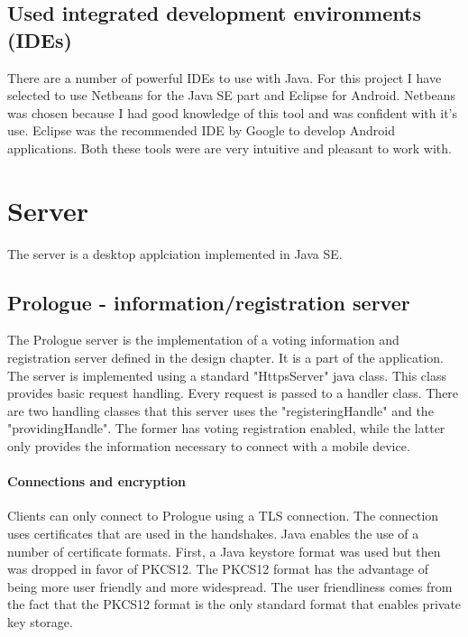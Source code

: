 \documentclass[11pt,twoside,a4paper]{book}
\begin{document}
\subsection{Used integrated development environments (IDEs)}
There are a number of powerful IDEs to use with Java. For this project I have selected to use Netbeans for the Java SE part and Eclipse for Android. Netbeans was chosen because I had good knowledge of this tool and was confident with it's use. Eclipse was the recommended IDE by Google to develop Android applications. Both these tools were are very intuitive and pleasant to work with. 

\section{Server}
The server is a desktop applciation implemented in Java SE.
\subsection{Prologue - information/registration server}
The Prologue server is the implementation of a voting information and registration server defined in the design chapter. It is a part of the application. The server is implemented using a standard "HttpsServer" java class. This class provides basic request handling. Every request is passed to a handler class. There are two handling classes that this server uses the "registeringHandle" and the "providingHandle". The former has voting registration enabled, while the latter only provides the information necessary to connect with a mobile device.
\paragraph{Connections and encryption}
Clients can only connect to Prologue using a TLS\cite{tls} connection. The connection uses certificates that are used in the handshakes. Java enables the use of a number of certificate formats. First, a Java keystore format was used but then was dropped in favor of PKCS12\cite{pkcs12}. The PKCS12 format has the advantage of being more user friendly and more widespread. The user friendliness comes from the fact that the PKCS12 format is the only standard format that enables private key storage.
\end{document}
